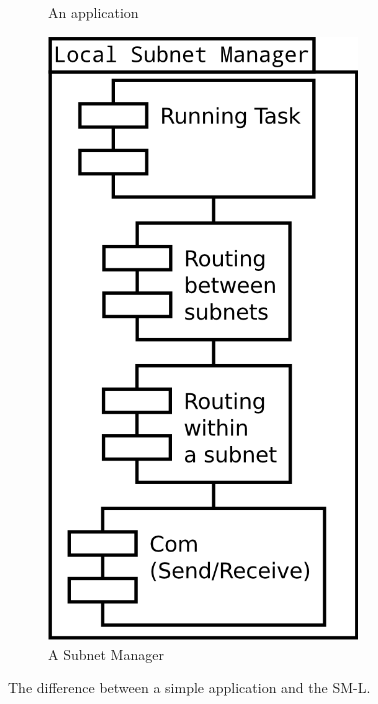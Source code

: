\begin{figure}[h]
\begin{subfigure}[b]{0.5\linewidth}
            \caption{An application}
            \label{fig:iteration2_uml_basic_application}
            \end{subfigure}%
        \begin{subfigure}[b]{.5\linewidth}
            \centering
            \includegraphics[width=0.9\textwidth]{figures/iteration2_uml_sm_l}
            \caption{A Subnet Manager}
            \label{fig:iteration2_uml_sm_l}
        \end{subfigure}
    \caption{The difference between a simple application and the SM-L.}
\label{fig:iteration2_difference}
\end{figure}

